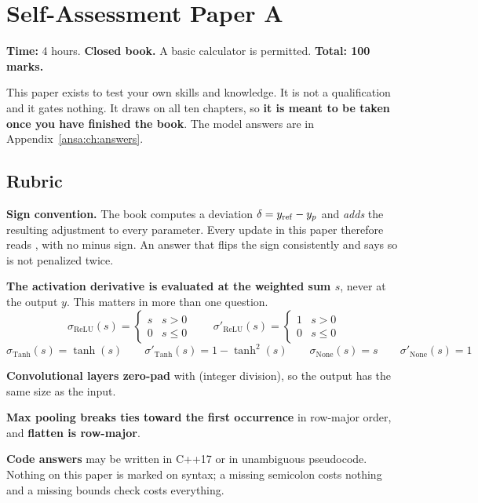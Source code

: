 
\chapter{Self-Assessment Paper A}
\label{exa:ch:paper}

\noindent\textbf{Time:} 4 hours. \textbf{Closed book.} A basic calculator is permitted.
\textbf{Total: 100 marks.}

This paper exists to test your own skills and knowledge. It is not a qualification and it gates
nothing. It draws on all ten chapters, so \textbf{it is meant to be taken once you have finished the
book}. The model answers are in Appendix~\ref{ansa:ch:answers}.

\section*{Rubric}
\textbf{Sign convention.} The book computes a deviation $\delta = y_{\mathrm{ref}} - y_{p}$ and \emph{adds} the
resulting adjustment to every parameter. Every update in this paper therefore reads
, with no minus sign. An answer that flips the sign
consistently and says so is not penalized twice.

\textbf{The activation derivative is evaluated at the weighted sum $s$}, never at the output $y$.
This matters in more than one question.
\[
  \sigma_{\mathrm{ReLU}}(s) = \begin{cases} s & s > 0 \\ 0 & s \leq 0 \end{cases} \qquad
  \sigma'_{\mathrm{ReLU}}(s) = \begin{cases} 1 & s > 0 \\ 0 & s \leq 0 \end{cases}
\]
\[
  \sigma_{\mathrm{Tanh}}(s) = \tanh(s) \qquad \sigma'_{\mathrm{Tanh}}(s) = 1 - \tanh^2(s) \qquad
  \sigma_{\mathrm{None}}(s) = s \qquad \sigma'_{\mathrm{None}}(s) = 1
\]

\textbf{Convolutional layers zero-pad} with  (integer division), so the
output has the same size as the input.

\textbf{Max pooling breaks ties toward the first occurrence} in row-major order, and \textbf{flatten
is row-major}.

\textbf{Code answers} may be written in C++17 or in unambiguous pseudocode. Nothing on this paper is
marked on syntax; a missing semicolon costs nothing and a missing bounds check costs everything.

